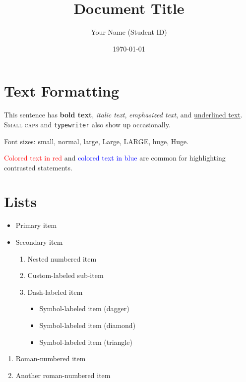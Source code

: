 \documentclass{article}
\title{Document Title}
\author{Your Name (Student ID)}
\date{\today}
\begin{document}
\maketitle

\section{Text Formatting}

This sentence has \textbf{bold text}, \textit{italic text}, \emph{emphasized text},
and \underline{underlined text}. \textsc{Small caps} and \texttt{typewriter} also
show up occasionally.

Font sizes: {\small small}, {\normalsize normal}, {\large large}, {\Large Large},
{\LARGE LARGE}, {\huge huge}, {\Huge Huge}.

\textcolor{red}{Colored text in red} and \textcolor{blue}{colored text in blue}
are common for highlighting contrasted statements.

\section{Lists}

\begin{itemize}
    \item Primary item
    \item Secondary item
        \begin{enumerate}
            \item Nested numbered item
            \item[(a)] Custom-labeled sub-item \\ %
            \item[-] Dash-labeled item
                \begin{itemize}
                    \item[$\dagger$] Symbol-labeled item (dagger)
                    \item[$\diamond$] Symbol-labeled item (diamond)
                    \item[$\rhd$] Symbol-labeled item (triangle)
                \end{itemize}
        \end{enumerate}
\end{itemize}

\begin{enumerate}[label={(\Roman*)}]
    \item Roman-numbered item
    \item Another roman-numbered item
\end{enumerate}
\end{document}
